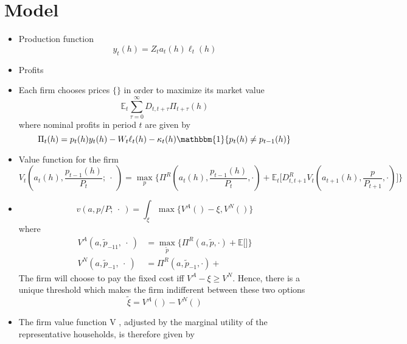 \documentclass[a4paper,10pt]{article}  %
\begin{document}
\section{Model} %
\label{sec:model}
\begin{itemize}
   \item Production function
   \begin{equation}
      \label{eq:model_eq1}
      y_t(h) = Z_t a_t(h) \ell_t(h)
   \end{equation}

   \item Profits
   
   \item Each firm chooses prices $ \{\} $ in order to maximize its market value
   \begin{equation}
      \label{eq:model_eq}
      \mathbb{E}_t \sum_{\tau=0}^{\infty} D_{t,t+\tau} \Pi_{t+\tau} (h)
   \end{equation}
   where nominal profits in period $ t $ are given by
   \begin{equation}
      \label{eq:model_eq3}
      \Pi_t(h) = p_t(h) y_t(h) - W_t \ell_t(h) - \kappa_t(h) \mathbbm{1}\{p_t(h) \ne p_{t-1}(h)\}
   \end{equation}
   \item Value function for the firm
   \[
      V_t \left( a_t(h), \frac{ p_{t-1}(h) }{ P_t }; \ \cdot \ \right) = 
      \max_{p} 
      \bigg\{
         \Pi^R \left( a_t(h), \frac{ p_{t-1}(h) }{ P_t }, \cdot \right) + 
         \mathbb{E}_t \bigg[ D^R_{t,t+1} V_t \left( a_{t+1}(h), \frac{ p }{ P_{t+1} }, \cdot \right) \bigg]
      \bigg\}
   \]

   \item 
   \[
      v(a, p/P; \ \cdot \ ) = \int_{\xi} \max \Big\{ V^A(  ) - \xi , V^N( )  \Big\}
   \]
   where
   \begin{equation}
      \label{eq:model_eq4}
      \begin{split}
      V^A(a, \tilde{p}_{-11}, \ \cdot \ ) & = \max_{\tilde{p}} 
         \bigg\{ 
            \Pi^R \left( a, \tilde{p}, \cdot \right) + 
            \mathbb{E} \bigg[  \bigg]
         \bigg\} \\
      V^N(a, \tilde{p}_{-1}, \ \cdot \ ) & = 
          \Pi^R \left( a, \tilde{p}_{-1}, \cdot \right) + 
      \end{split}
   \end{equation}
   The firm will choose to pay the fixed cost iff $ V^A -\xi \ge V^N $. Hence,
   there is a unique threshold which makes the firm indifferent between these
   two options
   \[
      \tilde{\xi} = V^A( ) - V^N( )
   \]

   \item The firm value function V , adjusted by the marginal utility of the representative households, is therefore given by
\end{itemize}
\end{document}
